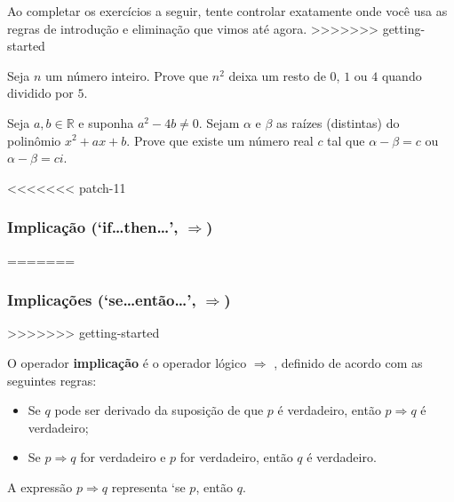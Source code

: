 \begin{itemizar}
Ao completar os exercícios a seguir, tente controlar exatamente onde você usa as regras de introdução e eliminação que vimos até agora.
>>>>>>> getting-started

\begin{exercise}
Seja $n$ um número inteiro. Prove que $n^2$ deixa um resto de $0$, $1$ ou $4$ quando dividido por $5$.
\end{exercise}

\begin{exercise}
Seja $a,b \in \mathbb{R}$ e suponha $a^2-4b \ne 0$. Sejam $\alpha$ e $\beta$ as raízes (distintas) do polinômio $x^2+ax+b$. Prove que existe um número real $c$ tal que $\alpha-\beta = c$ ou $\alpha - \beta = ci$.
\end{exercise}

<<<<<<< patch-11
\subsubsection*{Implicação (`if\dots{}then\dots{}', $\Rightarrow$)}
=======
\subsubsection*{Implicações (`se\dots{}então\dots{}', $\Rightarrow$)}
>>>>>>> getting-started

\begin{definition}
\label{defImplication}
O operador \textbf{implicação} é o operador lógico $\Rightarrow$ , definido de acordo com as seguintes regras:
\begin{itemize}
\item \introrule{\Rightarrow} Se $q$ pode ser derivado da suposição de que $p$ é verdadeiro, então $p \Rightarrow q$ é verdadeiro;
\item \elimrule{\Rightarrow} Se $p \Rightarrow q$ for verdadeiro e $p$ for verdadeiro, então $q$ é verdadeiro.
\end{itemize}
A expressão $p \Rightarrow q$ representa `se $p$, então $q$.
\end{definition}


\end{itemizar}
